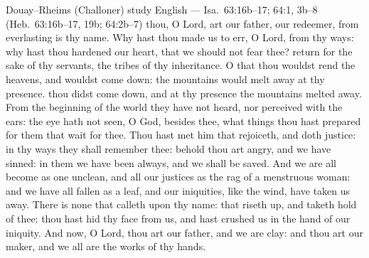 \begin{englishwitness}{Douay--Rheims (Challoner) study English --- Isa.~63:16b--17; 64:1, 3b--8 (Heb.~63:16b--17, 19b; 64:2b--7)}
 thou, O Lord, art our father, our redeemer, from everlasting is thy name. Why hast thou made us to err, O Lord, from thy ways: why hast thou hardened our heart, that we should not fear thee? return for the sake of thy servants, the tribes of thy inheritance.  O that thou wouldst rend the heavens, and wouldst come down: the mountains would melt away at thy presence.   thou didst come down, and at thy presence the mountains melted away. From the beginning of the world they have not heard, nor perceived with the ears: the eye hath not seen, O God, besides thee, what things thou hast prepared for them that wait for thee. Thou hast met him that rejoiceth, and doth justice: in thy ways they shall remember thee: behold thou art angry, and we have sinned: in them we have been always, and we shall be saved. And we are all become as one unclean, and all our justices as the rag of a menstruous woman: and we have all fallen as a leaf, and our iniquities, like the wind, have taken us away. There is none that calleth upon thy name: that riseth up, and taketh hold of thee: thou hast hid thy face from us, and hast crushed us in the hand of our iniquity. And now, O Lord, thou art our father, and we are clay: and thou art our maker, and we all are the works of thy hands.
\end{englishwitness}

